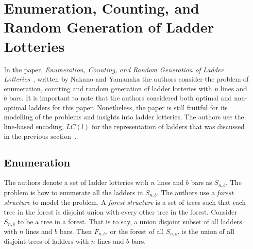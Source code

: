 \section{Enumeration, Counting, and Random Generation of \newline Ladder Lotteries}

In the paper, \emph{Enumeration, Counting, and Random Generation of Ladder Lotteries}~\cite{A6}, written by Nakano and Yamanaka 
the authors consider the problem of enumeration, counting and 
random generation of ladder lotteries with $n$ lines and $b$ bars. 
It is important to note that the authors considered both optimal and 
non-optimal ladders for this paper. Nonetheless, the paper is still fruitful 
for its modelling of the problems and insights into ladder lotteries.
The authors use  the line-based encoding, $LC(l)$ for the representation of ladders 
that was discussed in the previous section~\cite{A5}.

\subsection{Enumeration}
The authors denote a set of ladder lotteries with $n$ lines and 
$b$ bars as $S_{n,b}$. The problem is how to enumerate all the 
ladders in $S_{n,b}$. The authors use a \emph{forest structure}
to model the problem. A \emph{forest structure} is a set of trees 
such that each tree in the forest is disjoint union with every other 
tree in the forest. Consider $S_{n,b}$ to be a tree in a forest.
That is to say, a union disjoint subset of all ladders with $n$
lines and $b$ bars. Then $F_{n,b}$, or the forest of all $S_{n,b}$,
is the union of all disjoint trees of ladders with $n$ lines and $b$ bars. 


    
